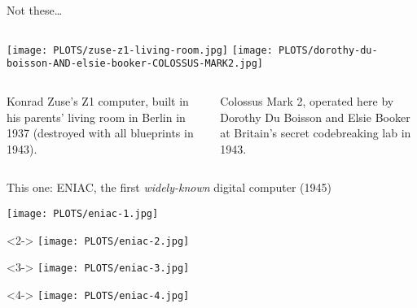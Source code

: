 \documentclass[aspectratio=169]{beamer}
\begin{document}
\begin{frame}{Not these\ldots}
\vspace{0.5 cm}

\begin{columns}
\texttt{[image: PLOTS/zuse-z1-living-room.jpg]}
\texttt{[image: PLOTS/dorothy-du-boisson-AND-elsie-booker-COLOSSUS-MARK2.jpg]}
\end{columns}

\vspace{0.5 cm}
\begin{columns}[t]
Konrad Zuse's Z1 computer, built in his parents' living room in Berlin in 1937 (destroyed with all blueprints in 1943).

Colossus Mark 2, operated here by Dorothy Du Boisson and Elsie Booker at Britain's secret codebreaking lab in 1943.
\end{columns}
\end{frame}

\begin{frame}{This one: ENIAC, the first {\it widely-known} digital computer (1945)}
\vspace{0.35 cm}

\mbox{\hspace{-0.25 cm}\texttt{[image: PLOTS/eniac-1.jpg]}}

\begin{onlyenv}<2->
\vspace{-7.5 cm}
\mbox{\hspace{0.75 cm}\texttt{[image: PLOTS/eniac-2.jpg]}}
\end{onlyenv}

\begin{onlyenv}<3->
\vspace{-7.5 cm}
\mbox{\hspace{1.75 cm}\texttt{[image: PLOTS/eniac-3.jpg]}}
\end{onlyenv}

\begin{onlyenv}<4->
\vspace{-7.5 cm}
\mbox{\hspace{2.75 cm}\texttt{[image: PLOTS/eniac-4.jpg]}}
\end{onlyenv}
\end{frame}
\end{document}
